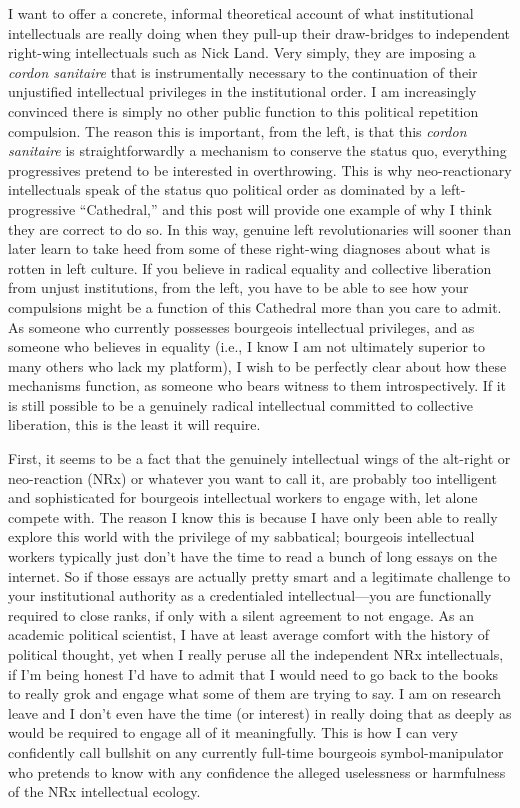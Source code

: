 \documentclass[a4paper,12pt,margin=.5in]{article}
\begin{document}
I want to offer a concrete, informal theoretical account of what
institutional intellectuals are really doing when they pull-up their
draw-bridges to independent right-wing intellectuals such as Nick Land.
Very simply, they are imposing a \emph{cordon sanitaire} that is
instrumentally necessary to the continuation of their unjustified
intellectual privileges in the institutional order. I am increasingly
convinced there is simply no other public function to this political
repetition compulsion. The reason this is important, from the left, is
that this \emph{cordon sanitaire} is straightforwardly a mechanism to
conserve the status quo, everything progressives pretend to be
interested in overthrowing. This is why neo-reactionary intellectuals
speak of the status quo political order as dominated by a
left-progressive ``Cathedral,'' and this post will provide one example
of why I think they are correct to do so. In this way, genuine left
revolutionaries will sooner than later learn to take heed from some of
these right-wing diagnoses about what is rotten in left culture. If you
believe in radical equality and collective liberation from unjust
institutions, from the left, you have to be able to see how your
compulsions might be a function of this Cathedral more than you care to
admit. As someone who currently possesses bourgeois intellectual
privileges, and as someone who believes in equality (i.e., I know I am
not ultimately superior to many others who lack my platform), I wish to
be perfectly clear about how these mechanisms function, as someone who
bears witness to them introspectively. If it is still possible to be a
genuinely radical intellectual committed to collective liberation, this
is the least it will require.

First, it seems to be a fact that the genuinely intellectual wings of
the alt-right or neo-reaction (NRx) or whatever you want to call it, are
probably too intelligent and sophisticated for bourgeois intellectual
workers to engage with, let alone compete with. The reason I know this
is because I have only been able to really explore this world with the
privilege of my sabbatical; bourgeois intellectual workers typically
just don't have the time to read a bunch of long essays on the internet.
So if those essays are actually pretty smart and a legitimate challenge
to your institutional authority as a credentialed intellectual---you are
functionally required to close ranks, if only with a silent agreement to
not engage. As an academic political scientist, I have at least average
comfort with the history of political thought, yet when I really peruse
all the independent NRx intellectuals, if I'm being honest I'd have to
admit that I would need to go back to the books to really grok and
engage what some of them are trying to say. I am on research leave and I
don't even have the time (or interest) in really doing that as deeply as
would be required to engage all of it meaningfully. This is how I can
very confidently call bullshit on any currently full-time bourgeois
symbol-manipulator who pretends to know with any confidence the alleged
uselessness or harmfulness of the NRx intellectual ecology.
\end{document}
